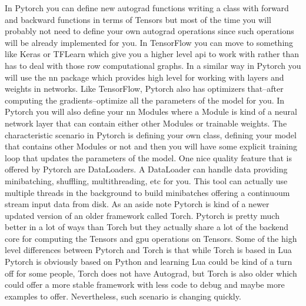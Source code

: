 \documentclass[11pt,a4paper]{article}
\begin{document}
In Pytorch you can define new autograd functions writing a class with forward and backward functions in terms of Tensors but most of the time you will probably not need to define your own autograd operations since such operations will be already implemented for you. In TensorFlow you can move to something like Keras or TFLearn which give you a higher level \gls{api} to work with rather than has to deal with those row computational graphs. In a similar way in Pytorch you will use the nn package which provides high level for working with layers and weights in networks. Like TensorFlow, Pytorch also has optimizers that--after computing the gradients--optimize all the parameters of the model for you. In Pytorch you will also define your nn Modules where a Module is kind of a neural network layer that can contain either other Modules or trainable weights. The characteristic scenario in Pytorch is defining your own class, defining your model that contains other Modules or not and then you will have some explicit training loop that updates the parameters of the model. One nice quality feature that is offered by Pytorch are DataLoaders. A DataLoader can handle data providing minibatching, shuffling, multithreading, etc for you. This tool can actually use multiple threads in the background to build minibatches offering a continuoum stream input data from disk. As an aside note Pytorch is kind of a newer updated version of an older framework called Torch. Pytorch is pretty much better in a lot of ways than Torch but they actually share a lot of the backend core for computing the Tensors and \gls{gpu} operations on Tensors. Some of the high level differences between Pytorch and Torch is that while Torch is based in Lua Pytorch is obviously based on Python and learning Lua could be kind of a turn off for some people, Torch does not have Autograd, but Torch is also older which could offer a more stable framework with less code to debug and maybe more examples to offer. Nevertheless, such scenario is changing quickly.
\end{document}
